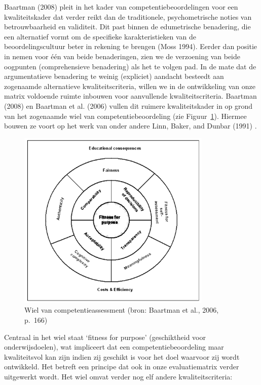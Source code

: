 \documentclass[
  letterpaper,
]{report}
\begin{document}
Baartman (2008) pleit in het kader van competentiebeoordelingen voor een
kwaliteitskader dat verder reikt dan de traditionele, psychometrische
noties van betrouwbaarheid en validiteit. Dit past binnen de
edumetrische benadering, die een alternatief vormt om de specifieke
karakteristieken van de beoordelingscultuur beter in rekening te brengen
(Moss 1994). Eerder dan positie in nemen voor één van beide
benaderingen, zien we de verzoening van beide oogpunten (comprehensieve
benadering) als het te volgen pad. In de mate dat de argumentatieve
benadering te weinig (expliciet) aandacht besteedt aan zogenaamde
alternatieve kwaliteitscriteria, willen we in de ontwikkeling van onze
matrix voldoende ruimte inbouwen voor aanvullende kwaliteitscriteria.
Baartman (2008) en Baartman et al. (2006) vullen dit ruimere
kwaliteitskader in op grond van het zogenaamde wiel van
competentiebeoordeling (zie Figuur~\ref{fig-figuur2}). Hiermee bouwen ze
voort op het werk van onder andere Linn, Baker, and Dunbar (1991) .

\begin{figure}

{\centering \includegraphics[width=3.64583in,height=\textheight]{./FIG2.jpg}

}

\caption{\label{fig-figuur2}Wiel van competentieassessment (bron:
Baartman et al., 2006, p.~166)}

\end{figure}

Centraal in het wiel staat `fitness for purpose' (geschiktheid voor
onderwijsdoelen), wat impliceert dat een competentiebeoordeling maar
kwaliteitsvol kan zijn indien zij geschikt is voor het doel waarvoor zij
wordt ontwikkeld. Het betreft een principe dat ook in onze
evaluatiematrix verder uitgewerkt wordt. Het wiel omvat verder nog elf
andere kwaliteitscriteria:
\end{document}
